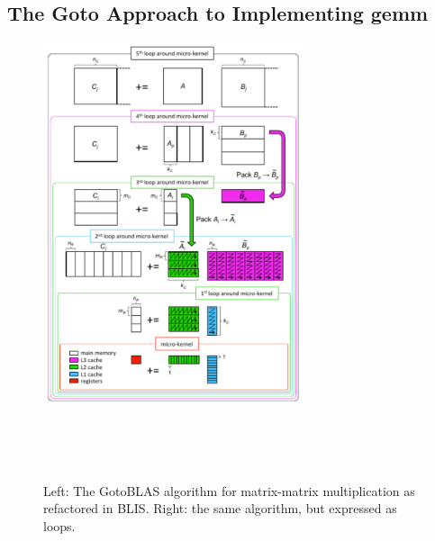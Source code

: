 \subsection{The Goto Approach to Implementing {\sc gemm}}
\label{sec:BLIS}

\begin{figure}[tb!]
	\begin{center}
		\begin{minipage}{3in}
			\mbox{\includegraphics[width=3.0in]{mm_blis_color.pdf}}
		\end{minipage}
		~~~
		\begin{minipage}[t]{3in}
			\footnotesize  
			\mbox{  }
		\end{minipage}
	\end{center}
	\caption{Left: The GotoBLAS algorithm for matrix-matrix multiplication as  
		refactored in BLIS.  Right: the same algorithm, but expressed as  
		loops.}
	\label{fig:blis_gemm}
\end{figure}

